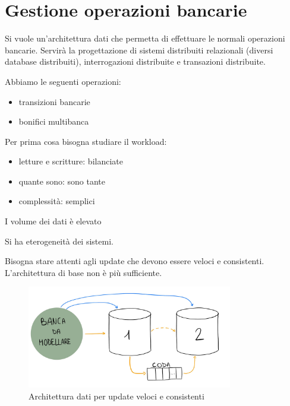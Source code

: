 \section{Gestione operazioni bancarie}
Si vuole un'architettura dati che permetta di effettuare le normali operazioni
bancarie. Servirà la progettazione di sistemi distribuiti relazionali (diversi database distribuiti),
interrogazioni distribuite e transazioni distribuite.

Abbiamo le seguenti operazioni:
\begin{itemize}
    \item transizioni bancarie
    \item bonifici multibanca
\end{itemize}

Per prima cosa bisogna studiare il workload:
\begin{itemize}
    \item letture e scritture: bilanciate
    \item quante sono: sono tante
    \item complessità: semplici
\end{itemize}

I volume dei dati è elevato

Si ha eterogeneità dei sistemi.

Bisogna stare attenti agli update che devono essere veloci e consistenti. L'architettura
di base non è più sufficiente.

\begin{figure}[ht]
      \centering
      \includegraphics[width=0.8\textwidth]{./img/modellazione_banca.jpg}
      \caption{Architettura dati per update veloci e consistenti}
      \label{fig:esBanca}
\end{figure}

